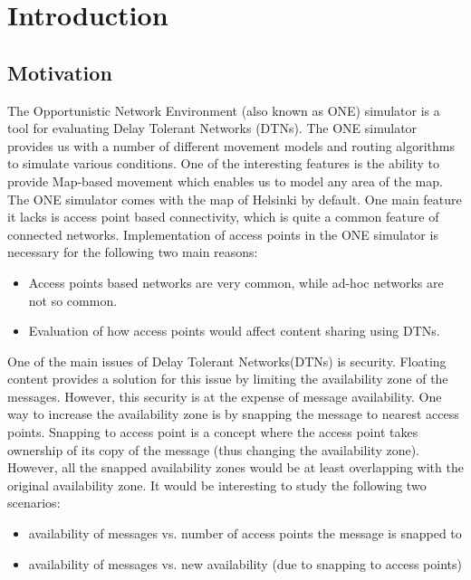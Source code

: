 
\chapter{Introduction}\label{chapter:introduction}

\section{Motivation}
The Opportunistic Network Environment (also known as ONE) simulator is a tool for evaluating Delay Tolerant Networks (DTNs). The ONE simulator provides us with a number of different movement models and routing algorithms to simulate various conditions. One of the interesting features is the ability to provide Map-based movement which enables us to model any area of the map. The ONE simulator comes with the map of Helsinki by default. One main feature it lacks is access point based connectivity, which is quite a common feature of connected networks. Implementation of access points in the ONE simulator is necessary for the following two main reasons:

\begin{itemize}
  \item Access points based networks are very common, while ad-hoc networks are not so common.
  \item Evaluation of how access points would affect content sharing using DTNs.
\end{itemize}

One of the main issues of Delay Tolerant Networks(DTNs) is security. Floating content provides a solution for this issue by limiting the availability zone of the messages. However, this security is at the expense of message availability. One way to increase the availability zone is by snapping the message to nearest access points. Snapping to access point is a concept where the access point takes ownership of its copy of the message (thus changing the availability zone). However, all the snapped availability zones would be at least overlapping with the original availability zone. It would be interesting to study the following two scenarios:
\begin{itemize}
  \item availability of messages vs. number of access points the message is snapped to
  \item availability of messages vs. new availability (due to snapping to access points)
\end{itemize}

